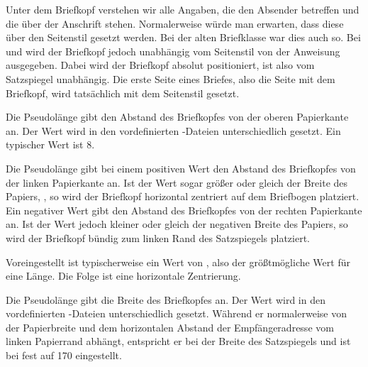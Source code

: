 Unter dem Briefkopf verstehen wir alle Angaben, die den Absender betreffen und
die über der Anschrift stehen. Normalerweise würde man erwarten, dass diese
über den Seitenstil gesetzt werden. Bei der alten Briefklasse 
war dies auch so. Bei  und
 wird der Briefkopf jedoch unabhängig vom Seitenstil von
der Anweisung  ausgegeben.
\iftrue%
Dabei wird der Briefkopf absolut positioniert, ist also vom Satzspiegel
unabhängig.  Die erste Seite eines Briefes, also die Seite mit dem Briefkopf,
wird tatsächlich mit dem Seitenstil
 gesetzt.%
\fi


\begin{Declaration}
\end{Declaration}
Die Pseudolänge  gibt den Abstand des Briefkopfes von
der oberen Papierkante an. Der Wert wird in den vordefinierten
-Dateien
unterschiedlich gesetzt. Ein typischer Wert ist 8.%
\EndIndexGroup


\begin{Declaration}
\end{Declaration}
Die Pseudolänge 
gibt bei einem positiven Wert den Abstand des Briefkopfes von der linken
Papierkante an. Ist der Wert sogar größer oder gleich der
Breite des Papiers,
, so
wird der Briefkopf horizontal zentriert auf dem Briefbogen platziert. Ein
negativer Wert gibt den Abstand des Briefkopfes von der rechten Papierkante
an. Ist der Wert jedoch kleiner oder gleich der negativen Breite des Papiers,
so wird der Briefkopf bündig zum linken Rand des Satzspiegels platziert.

Voreingestellt ist typischerweise ein Wert von
, also der größtmögliche Wert für eine
Länge. Die Folge ist eine horizontale Zentrierung.%
\EndIndexGroup


\begin{Declaration}
\end{Declaration}
Die Pseudolänge  gibt die Breite des Briefkopfes
an. Der Wert wird in den vordefinierten
-Dateien
unterschiedlich gesetzt. Während er normalerweise von der Papierbreite und dem
horizontalen Abstand der Empfängeradresse vom linken Papierrand abhängt,
entspricht er bei  der Breite des Satzspiegels und ist bei
 fest auf 170 eingestellt.%
\EndIndexGroup



